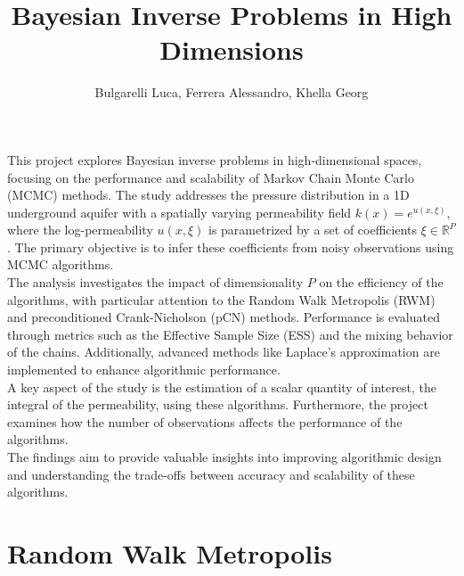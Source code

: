 \documentclass{article}
\begin{document}
\title{Bayesian Inverse Problems in High Dimensions}
\author{Bulgarelli Luca, Ferrera Alessandro, Khella Georg}
\date{}

\maketitle

This project explores Bayesian inverse problems in high-dimensional spaces, focusing on the performance 
and scalability of Markov Chain Monte Carlo (MCMC) methods. The study addresses the pressure distribution 
in a 1D underground aquifer with a spatially varying permeability field \(k(x) = e^{u(x, \xi)}\), where the 
log-permeability \(u(x, \xi)\) is parametrized by a set of coefficients \(\xi \in \mathbb{R}^P\). The primary 
objective is to infer these coefficients from noisy observations using MCMC algorithms.  \\
The analysis investigates the impact of dimensionality \(P\) on the efficiency of the algorithms, with particular 
attention to the Random Walk Metropolis (RWM) and preconditioned Crank-Nicholson (pCN) methods. Performance is 
evaluated through metrics such as the Effective Sample Size (ESS) and the mixing behavior of the chains. Additionally, 
advanced methods like Laplace’s approximation are implemented to enhance algorithmic performance.  \\
A key aspect of the study is the estimation of a scalar quantity of interest, the integral of the permeability, 
using these algorithms. Furthermore, the project examines how the number of observations affects the performance of the algorithms.  \\
The findings aim to provide valuable insights into improving algorithmic design and understanding the trade-offs 
between accuracy and scalability of these algorithms.

\section{Random Walk Metropolis}
\end{document}
